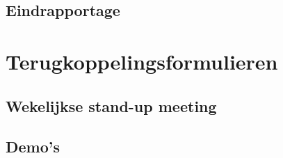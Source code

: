 \documentclass[a4paper]{article}
\begin{document}
    \subsection{Eindrapportage}
    

  \section{Terugkoppelingsformulieren}
    \subsection{Wekelijkse stand-up meeting}
    
    \clearpage
    \subsection{Demo's}
    
\end{document}
